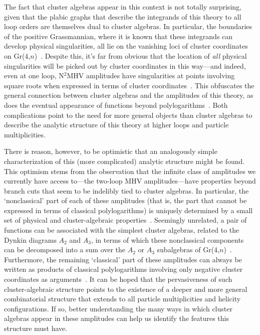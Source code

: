 \documentclass[12pt]{article}
\begin{document}
The fact that cluster algebras appear in this context is not totally surprising, given that the plabic graphs that describe the integrands of this theory to all loop orders are themselves dual to cluster algebras. In particular, the boundaries of the positive Grassmannian, where it is known that these integrands can develop physical singularities, all lie on the vanishing loci of cluster coordinates on Gr(4,$n$)~\cite{ArkaniHamed:2012nw}. Despite this, it's far from obvious that the location of \emph{all} physical singularities will be picked out by cluster coordinates in this way---and indeed, even at one loop, N$^2$MHV amplitudes have singularities at points involving square roots when expressed in terms of cluster coordinates~\cite{Prlina:2017azl}. This obfuscates the general connection between cluster algebras and the amplitudes of this theory, as does the eventual appearance of functions beyond polylogarithms~\cite{CaronHuot:2012ab,Bourjaily:2015jna,Bourjaily:2017wjl,Bourjaily:2017bsb,Bourjaily:2018ycu,Bourjaily:2018yfy}. Both complications point to the need for more general objects than cluster algebras to describe the analytic structure of this theory at higher loops and particle multiplicities.

There is reason, however, to be optimistic that an analogously simple characterization of this (more complicated) analytic structure might be found. This optimism stems from the observation that the infinite class of amplitudes we currently have access to---the two-loop MHV amplitudes---have properties beyond branch cuts that seem to be indelibly tied to cluster algebras. In particular, the `nonclassical' part of each of these amplitudes (that is, the part that cannot be expressed in terms of classical polylogarithms) is uniquely determined by a small set of physical and cluster-algebraic properties~\cite{Golden:2014pua}.  Seemingly unrelated, a pair of functions can be associated with the simplest cluster algebras, related to the Dynkin diagrams $A_2$ and $A_3$, in terms of which these nonclassical components can be decomposed into a sum over the $A_2$ or $A_3$ subalgebras of Gr(4,$n$)~\cite{Golden:2014xqa}. Furthermore, the remaining `classical' part of these amplitudes can always be written as products of classical polylogarithms involving only negative cluster coordinates as arguments~\cite{Golden:2014xqf}. It can be hoped that the pervasiveness of such cluster-algebraic structure points to the existence of a deeper and more general combinatorial structure that extends to all particle multiplicities and helicity configurations. If so, better understanding the many ways in which cluster algebras appear in these amplitudes can help us identify the features this structure must have.
\end{document}
